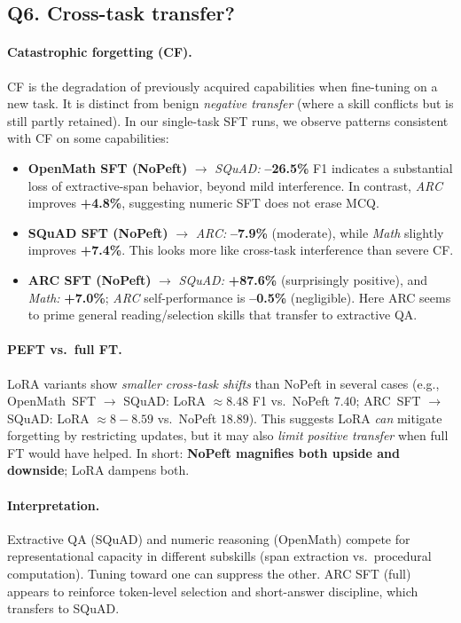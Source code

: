 \documentclass[11pt,a4paper]{article}
\begin{document}
\subsection*{Q6. Cross-task transfer?}

\paragraph{Catastrophic forgetting (CF).}
CF is the degradation of previously acquired capabilities when fine-tuning on a new task. It is distinct from benign \emph{negative transfer} (where a skill conflicts but is still partly retained). In our single-task SFT runs, we observe patterns consistent with CF on some capabilities:

\begin{itemize}
  \item \textbf{OpenMath SFT (NoPeft)} $\rightarrow$ \textit{SQuAD:} \textbf{--26.5\%} F1 indicates a substantial loss of extractive-span behavior, beyond mild interference. In contrast, \textit{ARC} improves \textbf{+4.8\%}, suggesting numeric SFT does not erase MCQ.
  \item \textbf{SQuAD SFT (NoPeft)} $\rightarrow$ \textit{ARC:} \textbf{--7.9\%} (moderate), while \textit{Math} slightly improves \textbf{+7.4\%}. This looks more like cross-task interference than severe CF.
  \item \textbf{ARC SFT (NoPeft)} $\rightarrow$ \textit{SQuAD:} \textbf{+87.6\%} (surprisingly positive), and \textit{Math:} \textbf{+7.0\%}; \textit{ARC} self-performance is \textbf{--0.5\%} (negligible). Here ARC seems to prime general reading/selection skills that transfer to extractive QA.
\end{itemize}

\paragraph{PEFT vs.\ full FT.}
LoRA variants show \emph{smaller cross-task shifts} than NoPeft in several cases (e.g., OpenMath~SFT $\rightarrow$ SQuAD: LoRA $\approx 8.48$ F1 vs.\ NoPeft $7.40$; ARC~SFT $\rightarrow$ SQuAD: LoRA $\approx 8\!-\!8.59$ vs.\ NoPeft $18.89$). This suggests LoRA \emph{can} mitigate forgetting by restricting updates, but it may also \emph{limit positive transfer} when full FT would have helped. In short: \textbf{NoPeft magnifies both upside and downside}; LoRA dampens both.

\paragraph{Interpretation.}
Extractive QA (SQuAD) and numeric reasoning (OpenMath) compete for representational capacity in different subskills (span extraction vs.\ procedural computation). Tuning toward one can suppress the other. ARC SFT (full) appears to reinforce token-level selection and short-answer discipline, which transfers to SQuAD.
\end{document}
